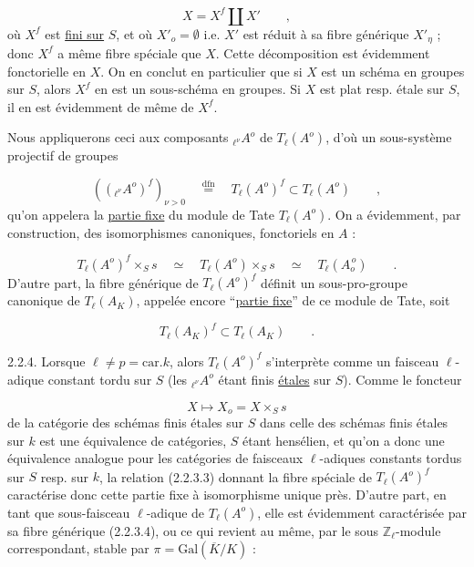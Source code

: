 \begin{equation}\tag{2.2.3.1}
X = X^{f} \coprod X' \qquad ,
\end{equation}
où $X^{f}$ est \underline{fini sur} $S$, et où $X'_{o} = \emptyset$ i.e. $X'$ est réduit à sa fibre générique $X'_{\eta}$ ; donc $X^{f}$ a même fibre spéciale que $X$. Cette décomposition est évidemment fonctorielle en $X$. On en conclut en particulier que si $X$ est un schéma en groupes sur $S$, alors $X^{f}$ en est un sous-schéma en groupes. Si $X$ est plat resp. étale sur $S$, il en est évidemment de même de $X^{f}$.

Nous appliquerons ceci aux composants ${}_{\ell^{\nu}}A^{o}$ de $T_{\ell}(A^{o})$, d'où un sous-système projectif de groupes

\begin{equation}\tag{2.2.3.2}
(({}_{\ell^{\nu}}A^{o})^{f})_{\nu > 0} \quad \stackrel{\mathrm{dfn}}{=} \quad T_{\ell}(A^{o})^{f} \subset T_{\ell}(A^{o}) \qquad ,
\end{equation}
qu'on appelera la \underline{partie fixe} du module de Tate $T_{\ell}(A^{o})$. On a évidemment, par construction, des isomorphismes canoniques, fonctoriels en $A$ :

\begin{equation}\tag{2.2.3.3}
T_{\ell}(A^{o})^{f} \times_{S} s \quad \simeq \quad T_{\ell}(A^{o}) \times_{S} s \quad \simeq \quad T_{\ell}(A_{o}^{\,o}) \qquad .
\end{equation}
D'autre part, la fibre générique de $T_{\ell}(A^{o})^{f}$ définit un sous-pro-groupe canonique de $T_{\ell}(A_{K})$, appelée encore ``\underline{partie fixe}'' de ce module de Tate, soit

\begin{equation}\tag{2.2.3.4}
T_{\ell}(A_{K})^{f} \subset T_{\ell}(A_{K}) \qquad .
\end{equation}


2.2.4. Lorsque $\ell \neq p = \mathrm{car}.k$, alors $T_{\ell}(A^{o})^{f}$ s'interprète comme un faisceau $\ell$-adique constant tordu sur $S$ (les ${}_{\ell^{\nu}}A^{o}$ étant finis \underline{étales} sur $S$). Comme le foncteur

\begin{equation*}
X \longmapsto X_{o} = X \times_{S} s
\end{equation*}
de la catégorie des schémas finis étales sur $S$ dans celle des schémas finis étales sur $k$ est une équivalence de catégories, $S$ étant hensélien, et qu'on a donc une équivalence analogue pour les catégories de faisceaux $\ell$-adiques constants tordus sur $S$ resp. sur $k$, la relation (2.2.3.3) donnant la fibre spéciale de $T_{\ell}(A^{o})^{f}$ caractérise donc cette partie fixe à isomorphisme unique près. D'autre part, en tant que sous-faisceau $\ell$-adique de $T_{\ell}(A^{o})$, elle est évidemment caractérisée par sa fibre générique (2.2.3.4), ou ce qui revient au même, par le sous $\mathbb{Z}_{\ell}$-module correspondant, stable par $\pi = \mathrm{Gal}(\overline{K}/K)$ :

